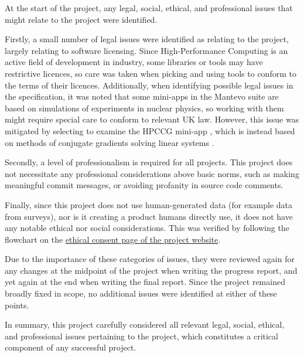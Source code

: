 At the start of the project, any legal, social, ethical, and professional issues that might relate to the project were identified. 

Firstly, a small number of legal issues were identified as relating to the project, largely relating to software licensing. Since High-Performance Computing is an active field of development in industry, some libraries or tools may have restrictive licences, so care was taken when picking and using tools to conform to the terms of their licences. Additionally, when identifying possible legal issues in the specification, it was noted that some mini-apps in the Mantevo suite are based on simulations of experiments in nuclear physics, so working with them might require special care to conform to relevant UK law. However, this issue was mitigated by selecting to examine the HPCCG mini-app \cite{herouxHPCCGSolverPackage2007}, which is instead based on methods of conjugate gradients solving linear systems \cite{hestenesMethodsConjugateGradients1952}.

Secondly, a level of professionalism is required for all projects. This project does not necessitate any professional considerations above basic norms, such as making meaningful commit messages, or avoiding profanity in source code comments. %

Finally, since this project does not use human-generated data (for example data from surveys), nor is it creating a product humans directly use, it does not have any notable ethical nor social considerations. This was verified by following the flowchart on the \href{https://warwick.ac.uk/fac/sci/dcs/teaching/ethics}{ethical consent page of the project website}. %

Due to the importance of these categories of issues, they were reviewed again for any changes at the midpoint of the project when writing the progress report, and yet again at the end when writing the final report. Since the project remained broadly fixed in scope, no additional issues were identified at either of these points.

In summary, this project carefully considered all relevant legal, social, ethical, and professional issues pertaining to the project, which constitutes a critical component of any successful project.

